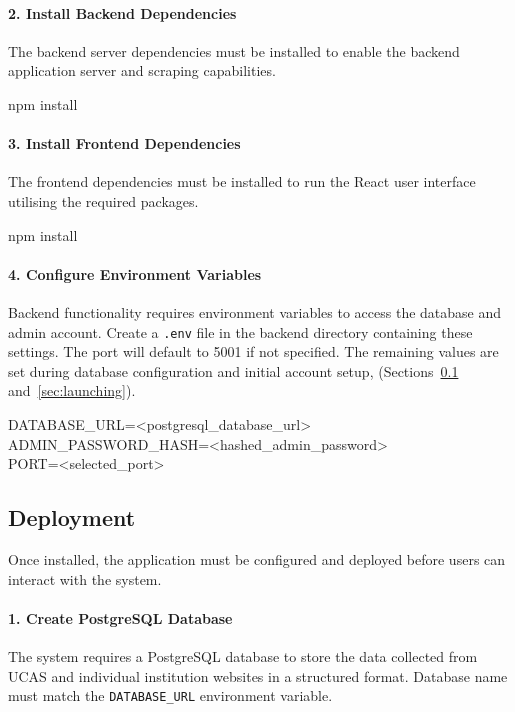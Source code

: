 \paragraph{2. Install Backend Dependencies} The backend server dependencies must be installed to enable the backend application server and scraping capabilities. 

\begin{commandbox}[/backend]
npm install
\end{commandbox}

\paragraph{3. Install Frontend Dependencies} The frontend dependencies must be installed to run the React user interface utilising the required packages. 

\begin{commandbox}[/frontend]
npm install
\end{commandbox}

\paragraph{4. Configure Environment Variables} 
Backend functionality requires environment variables to access the database and admin account. Create a \texttt{.env} file in the backend directory containing these settings. The port will default to 5001 if not specified. The remaining values are set during database configuration and initial account setup, (Sections~\ref{sec:deployment} and~\ref{sec:launching}).

\begin{commandbox}
DATABASE\_URL=\textless postgresql\_database\_url\textgreater \\
ADMIN\_PASSWORD\_HASH=\textless hashed\_admin\_password\textgreater \\
PORT=\textless selected\_port\textgreater
\end{commandbox}


\subsection{Deployment}
\label{sec:deployment}

Once installed, the application must be configured and deployed before users can interact with the system. 

\paragraph{1. Create PostgreSQL Database} The system requires a PostgreSQL database to store the data collected from UCAS and individual institution websites in a structured format. Database name must match the \texttt{DATABASE\_URL} environment variable.

